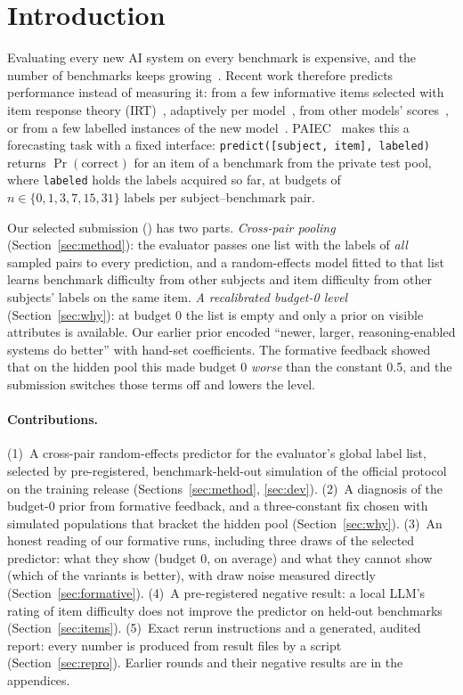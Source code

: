 \documentclass{article}
\begin{document}
\section{Introduction}
\label{sec:intro}

Evaluating every new AI system on every benchmark is expensive, and the number of benchmarks keeps growing~\citep{liang2022helm}. Recent work therefore predicts performance instead of measuring it: from a few informative items selected with item response theory (IRT)~\citep{polo2024tinybenchmarks,kipnis2025metabench,perlitz2024efficient}, adaptively per model~\citep{hofmann2025fluid,zhuang2025position}, from other models' scores~\citep{ruan2024observational,ye2023predictable}, or from a few labelled instances of the new model~\citep{pacchiardi2024hundred}. PAIEC~\citep{paiec2026} makes this a forecasting task with a fixed interface: \texttt{predict([subject, item], labeled)} returns $\Pr(\text{correct})$ for an item of a benchmark from the private test pool, where \texttt{labeled} holds the labels acquired so far, at budgets of $n\in\{0,1,3,7,15,31\}$ labels per subject--benchmark pair.

Our selected submission (\SelId) has two parts. \emph{Cross-pair pooling} (Section~\ref{sec:method}): the evaluator passes one list with the labels of \emph{all} sampled pairs to every prediction, and a random-effects model fitted to that list learns benchmark difficulty from other subjects and item difficulty from other subjects' labels on the same item. \emph{A recalibrated budget-0 level} (Section~\ref{sec:why}): at budget 0 the list is empty and only a prior on visible attributes is available. Our earlier prior encoded ``newer, larger, reasoning-enabled systems do better'' with hand-set coefficients. The formative feedback showed that on the hidden pool this made budget 0 \emph{worse} than the constant 0.5, and the submission switches those terms off and lowers the level.

\paragraph{Contributions.} (1)~A cross-pair random-effects predictor for the evaluator's global label list, selected by pre-registered, benchmark-held-out simulation of the official protocol on the training release (Sections~\ref{sec:method}, \ref{sec:dev}). (2)~A diagnosis of the budget-0 prior from formative feedback, and a three-constant fix chosen with simulated populations that bracket the hidden pool (Section~\ref{sec:why}). (3)~An honest reading of our formative runs, including three draws of the selected predictor: what they show (budget 0, on average) and what they cannot show (which of the variants is better), with draw noise measured directly (Section~\ref{sec:formative}). (4)~A pre-registered negative result: a local LLM's rating of item difficulty does not improve the predictor on held-out benchmarks (Section~\ref{sec:items}). (5)~Exact rerun instructions and a generated, audited report: every number is produced from result files by a script (Section~\ref{sec:repro}). Earlier rounds and their negative results are in the appendices.
\end{document}
